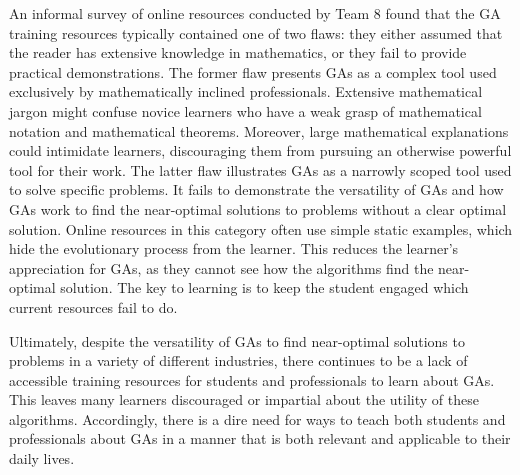 \documentclass{article}
\begin{document}
An informal survey of online resources conducted by Team 8 found that the GA 
training resources typically contained one of two flaws: they either assumed 
that the reader has extensive knowledge in mathematics, or they fail to provide 
practical demonstrations. The former flaw presents GAs as a complex tool used 
exclusively by mathematically inclined professionals. Extensive mathematical 
jargon might confuse novice learners who have a weak grasp of mathematical 
notation and mathematical theorems. Moreover, large mathematical explanations 
could intimidate learners, discouraging them from pursuing an otherwise powerful 
tool for their work. The latter flaw illustrates GAs as a narrowly scoped tool 
used to solve specific problems. It fails to demonstrate the versatility of GAs 
and how GAs work to find the near-optimal solutions to problems without a clear 
optimal solution. Online resources in this category often use simple static 
examples, which hide the evolutionary process from the learner. This reduces the 
learner's appreciation for GAs, as they cannot see how the algorithms find the 
near-optimal solution. The key to learning is to keep the student engaged which 
current resources fail to do.

Ultimately, despite the versatility of GAs to find near-optimal solutions to 
problems in a variety of different industries, there continues to be a lack of 
accessible training resources for students and professionals to learn about GAs. 
This leaves many learners discouraged or impartial about the utility of these 
algorithms. Accordingly, there is a dire need for ways to teach both students 
and professionals about GAs in a manner that is both relevant and applicable to 
their daily lives.
\end{document}
